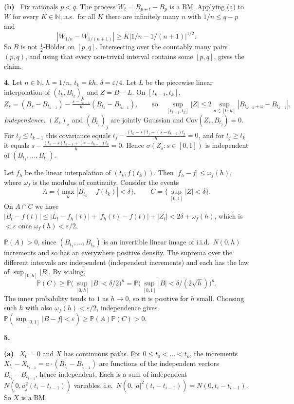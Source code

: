 \documentclass[11pt,a4paper]{article}
\renewcommand{\P}{\mathbb{P}}
\newcommand{\N}{\mathbb{N}}
\newcommand{\1}{\mathbf{1}}
\newcommand{\prob}[1]{\par\medskip\noindent\textbf{#1}\quad}
\newcommand{\sub}[1]{\par\smallskip\noindent\textbf{#1}\ }
\begin{document}
\sub{(b)} Fix rationals $p<q$. The process $W_t=B_{p+t}-B_p$ is a BM. Applying (a) to $W$ for every $K\in\N$, a.s.\ for all $K$
there are infinitely many $n$ with $1/n\le q-p$ and
\[|W_{1/n}-W_{1/(n+1)}|\ge K|1/n-1/(n+1)|^{1/2}.\]
So $B$ is not $\frac12$-H\"older on $[p,q]$. Intersecting over the countably many pairs $(p,q)$, and using that every
non-trivial interval contains some $[p,q]$, gives the claim.

\prob{4.}
Let $n\in\N$, $h=1/n$, $t_k=kh$, $\delta=\varepsilon/4$. Let $L$ be the piecewise linear interpolation of
$(t_k,B_{t_k})_k$ and $Z=B-L$. On $[t_{k-1},t_k]$,
\[
Z_s=(B_s-B_{t_{k-1}})-\tfrac{s-t_{k-1}}{h}(B_{t_k}-B_{t_{k-1}}),\qquad\text{so}\quad
\sup_{[t_{k-1},t_k]}|Z|\le2\sup_{u\in[0,h]}|B_{t_{k-1}+u}-B_{t_{k-1}}|.
\]
\emph{Independence.} $(Z_s)_s$ and $(B_{t_j})_j$ are jointly Gaussian and
$\mathrm{Cov}(Z_s,B_{t_j})=0$. For $t_j\le t_{k-1}$ this covariance equals
$t_j-\frac{(t_k-s)t_j+(s-t_{k-1})t_j}{h}=0$, and for $t_j\ge t_k$ it equals
$s-\frac{(t_k-s)t_{k-1}+(s-t_{k-1})t_k}{h}=0$. Hence $\sigma(Z_s:s\in[0,1])$ is independent of
$(B_{t_1},\dots,B_{t_n})$.

Let $f_h$ be the linear interpolation of $(t_k,f(t_k))$. Then $|f_h-f|\le\omega_f(h)$, where
$\omega_f$ is the modulus of continuity. Consider the events
\[
A=\{\max_k|B_{t_k}-f(t_k)|<\delta\},\qquad C=\{\sup_{[0,1]}|Z|<\delta\}.
\]
On $A\cap C$ we have $|B_t-f(t)|\le|L_t-f_h(t)|+|f_h(t)-f(t)|+|Z_t|<2\delta+\omega_f(h)$, which is
$<\varepsilon$ once $\omega_f(h)<\varepsilon/2$.

$\P(A)>0$, since $(B_{t_1},\dots,B_{t_n})$ is an invertible linear image of i.i.d.\ $N(0,h)$
increments and so has an everywhere positive density. The suprema over the different intervals are independent
(independent increments) and each has the law of $\sup_{[0,h]}|B|$. By scaling,
\[
\P(C)\ge\P\big(\sup_{[0,h]}|B|<\delta/2\big)^n=\P\big(\sup_{[0,1]}|B|<\delta/(2\sqrt h)\big)^n.
\]
The inner probability tends to $1$ as $h\to0$, so it is positive for $h$ small. Choosing such
$h$ with also $\omega_f(h)<\varepsilon/2$, independence gives
$\P(\sup_{[0,1]}|B-f|<\varepsilon)\ge\P(A)\P(C)>0$.

\prob{5.}
\sub{(a)} $X_0=0$ and $X$ has continuous paths. For $0\le t_0<\dots<t_k$, the increments
$X_{t_i}-X_{t_{i-1}}=a\cdot(B_{t_i}-B_{t_{i-1}})$ are functions of the independent vectors
$B_{t_i}-B_{t_{i-1}}$, hence independent. Each is a sum of independent
$N(0,a_j^2(t_i-t_{i-1}))$ variables, i.e.\ $N(0,|a|^2(t_i-t_{i-1}))=N(0,t_i-t_{i-1})$. So $X$ is a BM.
\end{document}
